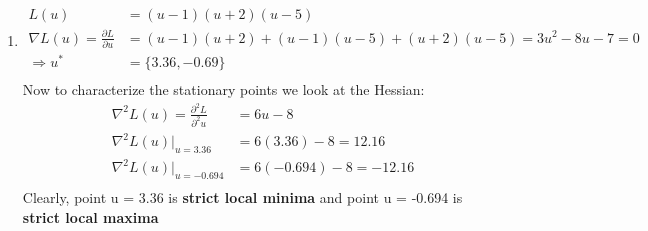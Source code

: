 \begin{enumerate}
\begin{enumerate}
   \item %
   \begin{align*}
    L(u) &= (u-1)(u+2)(u-5) \\
    \nabla L(u) = \frac{\partial L}{\partial u} &= (u-1)(u+2) + (u-1)(u-5) +
(u+2)(u-5) = 3 u^2 -8u -7 = 0\\
    \Rightarrow u^* &= \{3.36, -0.69\}\\
  \end{align*}
  Now to characterize the stationary points we look at the Hessian:
  \begin{align*}
   \nabla^2 L(u) = \frac{\partial^2 L}{\partial^2 u} &= 6u -8\\
   \nabla^2 L(u) |_{u = 3.36} &= 6 (3.36) - 8 = 12.16 \\
   \nabla^2 L(u) |_{u = -0.694} &= 6 (-0.694) - 8 = -12.16 \\
  \end{align*}
  Clearly, point u = 3.36 is \textbf{strict local minima} and point u = -0.694
is \textbf{strict local maxima}
  

\end{enumerate}
\end{enumerate}
